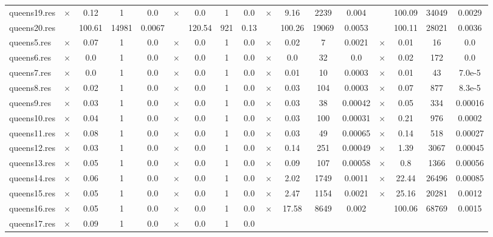 \documentclass[main.tex]{subfiles}
\begin{document}
\begin{landscape}
\begin{center}
\begin{tabular}{|l|cccc|cccc|cccc|cccc|}
\\
queens19.res & $\times$ & 0.12 & 1 & 0.0
 & $\times$ & 0.0 & 1 & 0.0
 & $\times$ & 9.16 & 2239 & 0.004
 &  & 100.09 & 34049 & 0.0029
\\
queens20.res &  & 100.61 & 14981 & 0.0067
 &  & 120.54 & 921 & 0.13
 &  & 100.26 & 19069 & 0.0053
 &  & 100.11 & 28021 & 0.0036
\\
queens5.res & $\times$ & 0.07 & 1 & 0.0
 & $\times$ & 0.0 & 1 & 0.0
 & $\times$ & 0.02 & 7 & 0.0021
 & $\times$ & 0.01 & 16 & 0.0
\\
queens6.res & $\times$ & 0.0 & 1 & 0.0
 & $\times$ & 0.0 & 1 & 0.0
 & $\times$ & 0.0 & 32 & 0.0
 & $\times$ & 0.02 & 172 & 0.0
\\
queens7.res & $\times$ & 0.0 & 1 & 0.0
 & $\times$ & 0.0 & 1 & 0.0
 & $\times$ & 0.01 & 10 & 0.0003
 & $\times$ & 0.01 & 43 & 7.0e-5
\\
queens8.res & $\times$ & 0.02 & 1 & 0.0
 & $\times$ & 0.0 & 1 & 0.0
 & $\times$ & 0.03 & 104 & 0.0003
 & $\times$ & 0.07 & 877 & 8.3e-5
\\
queens9.res & $\times$ & 0.03 & 1 & 0.0
 & $\times$ & 0.0 & 1 & 0.0
 & $\times$ & 0.03 & 38 & 0.00042
 & $\times$ & 0.05 & 334 & 0.00016
\\
queens10.res & $\times$ & 0.04 & 1 & 0.0
 & $\times$ & 0.0 & 1 & 0.0
 & $\times$ & 0.03 & 100 & 0.00031
 & $\times$ & 0.21 & 976 & 0.0002
\\
queens11.res & $\times$ & 0.08 & 1 & 0.0
 & $\times$ & 0.0 & 1 & 0.0
 & $\times$ & 0.03 & 49 & 0.00065
 & $\times$ & 0.14 & 518 & 0.00027
\\
queens12.res & $\times$ & 0.03 & 1 & 0.0
 & $\times$ & 0.0 & 1 & 0.0
 & $\times$ & 0.14 & 251 & 0.00049
 & $\times$ & 1.39 & 3067 & 0.00045
\\
queens13.res & $\times$ & 0.05 & 1 & 0.0
 & $\times$ & 0.0 & 1 & 0.0
 & $\times$ & 0.09 & 107 & 0.00058
 & $\times$ & 0.8 & 1366 & 0.00056
\\
queens14.res & $\times$ & 0.06 & 1 & 0.0
 & $\times$ & 0.0 & 1 & 0.0
 & $\times$ & 2.02 & 1749 & 0.0011
 & $\times$ & 22.44 & 26496 & 0.00085
\\
queens15.res & $\times$ & 0.05 & 1 & 0.0
 & $\times$ & 0.0 & 1 & 0.0
 & $\times$ & 2.47 & 1154 & 0.0021
 & $\times$ & 25.16 & 20281 & 0.0012
\\
queens16.res & $\times$ & 0.05 & 1 & 0.0
 & $\times$ & 0.0 & 1 & 0.0
 & $\times$ & 17.58 & 8649 & 0.002
 &  & 100.06 & 68769 & 0.0015
\\
queens17.res & $\times$ & 0.09 & 1 & 0.0
 & $\times$ & 0.0 & 1 & 0.0

\end{tabular}
\end{center}
\end{landscape}
\end{document}

